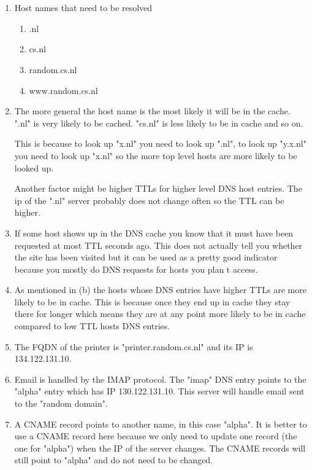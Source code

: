 \documentclass[12pt, a4paper]{article}
\begin{document}
\section{} %
\begin{enumerate}[a]
	\item %
	Host names that need to be resolved
	\begin{enumerate}
		\item .nl
		\item cs.nl
		\item random.cs.nl
		\item www.random.cs.nl
	\end{enumerate}

	\item %
	The more general the host name is the most likely it will be in the cache. ".nl" is very likely to be cached. "cs.nl" is less likely to be in cache and so on.

	This is because to look up "x.nl" you need to look up ".nl", to look up "y.x.nl" you need to look up "x.nl" so the more top level hosts are more likely to be looked up.

	Another factor might be higher TTLs for higher level DNS host entries. The ip of the ".nl" server probably does not change often so the TTL can be higher.

	\item %
	If some host shows up in the DNS cache you know that it must have been requested at most TTL seconds ago. This does not actually tell you whether the site has been visited but it can be used as a pretty good indicator because you mostly do DNS requests for hosts you plan t access.

	\item %
	As mentioned in (b) the hosts whose DNS entries have higher TTLs are more likely to be in cache. This is because once they end up in cache they stay there for longer which means they are at any point more likely to be in cache compared to low TTL hosts DNS entries.

	\item %
	The FQDN of the printer is "printer.random.cs.nl" and its IP is 134.122.131.10.

	\item %
	Email is handled by the IMAP protocol. The "imap" DNS entry points to the "alpha" entry which has IP 130.122.131.10. This server will handle email sent to the "random domain".

	\item %
	A CNAME record points to another name, in this case "alpha". It is better to use a CNAME record here because we only need to update one record (the one for "alpha") when the IP of the server changes. The CNAME records will still point to "alpha" and do not need to be changed.
\end{enumerate}
\end{document}
